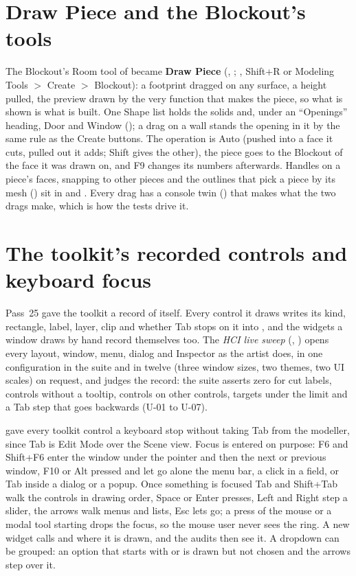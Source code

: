 \section{Draw Piece and the Blockout's tools}
The Blockout's Room tool of  became \textbf{Draw Piece} (, ; , Shift+R
or Modeling Tools $>$ Create $>$ Blockout): a footprint dragged on any surface, a height pulled, the preview drawn by the
very function that makes the piece, so what is shown is what is built. One Shape list holds the solids and, under an
``Openings'' heading, Door and Window (); a drag on a wall stands the opening in it by the same rule as the
Create buttons. The operation is Auto (pushed into a face it cuts, pulled out it adds; Shift gives the other), the piece goes to the Blockout of the face it
was drawn on, and F9 changes its numbers afterwards. Handles on a piece's faces, snapping to other pieces and the outlines
that pick a piece by its mesh () sit in  and
. Every drag has a console twin () that makes what the two drags make, which is how the tests drive it.

\section{The toolkit's recorded controls and keyboard focus}
Pass~25 gave the toolkit a record of itself. Every control it draws writes its kind, rectangle, label, layer, clip and
whether Tab stops on it into , and the widgets a window draws by hand record themselves too.
The \emph{HCI live sweep} (, ) opens every layout, window, menu, dialog
and Inspector as the artist does, in one configuration in the suite and in twelve (three window sizes, two themes, two UI
scales) on request, and judges the record: the suite asserts zero for cut labels, controls without a tooltip, controls on
other controls, targets under the limit and a Tab step that goes backwards (U-01 to U-07).

 gave every toolkit control a keyboard stop without taking Tab from the modeller, since Tab is Edit Mode over
the Scene view. Focus is entered on purpose: F6 and Shift+F6 enter the window under the pointer and then the next or
previous window, F10 or Alt pressed and let go alone the menu bar, a click in a field, or Tab inside a dialog or a popup.
Once something is focused Tab and Shift+Tab walk the controls in drawing order, Space or Enter presses, Left and Right step
a slider, the arrows walk menus and lists, Esc lets go; a press of the mouse or a modal tool starting drops the focus, so
the mouse user never sees the ring. A new widget calls  and  where it is drawn, and
the audits then see it. A dropdown can be grouped: an option that starts with  or
 is drawn but not chosen and the arrows step over it.

